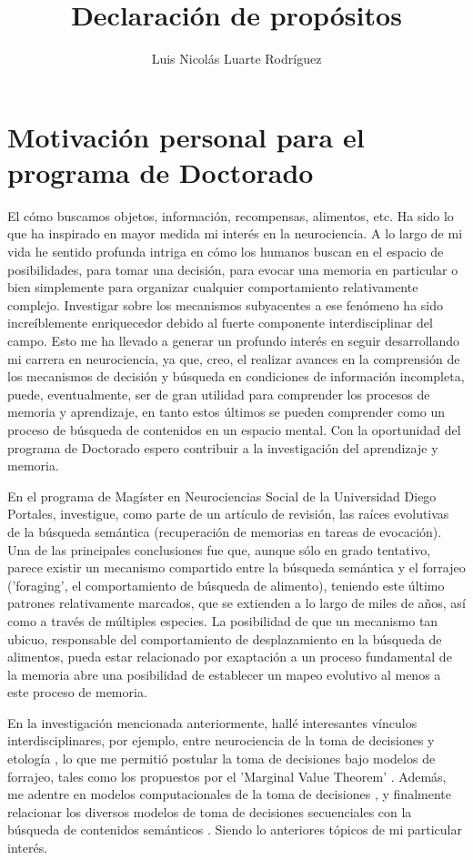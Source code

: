 \documentclass[11pt]{article}
\author{Luis Nicolás Luarte Rodríguez}
\date{}
\title{Declaración de propósitos}
\begin{document}
\maketitle
\section*{Motivación personal para el programa de Doctorado}
\label{sec:orge6072d9}
El cómo buscamos objetos, información, recompensas, alimentos, etc. Ha sido lo
que ha inspirado en mayor medida mi interés en la neurociencia. A lo largo de mi
vida he sentido profunda intriga en cómo los humanos buscan en el espacio de
posibilidades, para tomar una decisión, para evocar una memoria en particular o
bien simplemente para organizar cualquier comportamiento relativamente complejo.
Investigar sobre los mecanismos subyacentes a ese fenómeno ha sido
increíblemente enriquecedor debido al fuerte componente interdisciplinar del
campo. Esto me ha llevado a generar un profundo interés en seguir desarrollando
mi carrera en neurociencia, ya que, creo, el realizar avances en la comprensión
de los mecanismos de decisión y búsqueda en condiciones de información
incompleta, puede, eventualmente, ser de gran utilidad para comprender los
procesos de memoria y aprendizaje, en tanto estos últimos se pueden comprender
como un proceso de búsqueda de contenidos en un espacio mental. Con la
oportunidad del programa de Doctorado espero contribuir a la investigación del
aprendizaje y memoria.

En el programa de Magíster en Neurociencias Social de la Universidad Diego
Portales, investigue, como parte de un artículo de revisión, las raíces
evolutivas de la búsqueda semántica (recuperación de memorias en tareas de
evocación). Una de las principales conclusiones fue que, aunque sólo en grado
tentativo, parece existir un mecanismo compartido entre la búsqueda semántica y
el forrajeo ('foraging', el comportamiento de búsqueda de alimento), teniendo
este último patrones relativamente marcados, que se extienden a lo largo de
miles de años, así como a través de múltiples especies. La posibilidad de que un
mecanismo tan ubicuo, responsable del comportamiento de desplazamiento en la
búsqueda de alimentos, pueda estar relacionado por exaptación a un proceso
fundamental de la memoria abre una posibilidad de establecer un mapeo evolutivo
al menos a este proceso de memoria.

En la investigación mencionada anteriormente, hallé interesantes vínculos
interdisciplinares, por ejemplo, entre neurociencia de la toma de decisiones y
etología \citep{mobbsForagingFoundationsDecision2018a}, lo que me permitió
postular la toma de decisiones bajo modelos de forrajeo, tales como los
propuestos por el 'Marginal Value Theorem'
\citep{charnovOptimalForagingMarginal1976}. Además, me adentre en modelos
computacionales de la toma de decisiones
\citep{aston-jonesINTEGRATIVETHEORYLOCUS2005a}, y finalmente relacionar los
diversos modelos de toma de decisiones secuenciales con la búsqueda de
contenidos semánticos \citep{hillsForagingSemanticFields2015}. Siendo lo
anteriores tópicos de mi particular interés.
\end{document}
